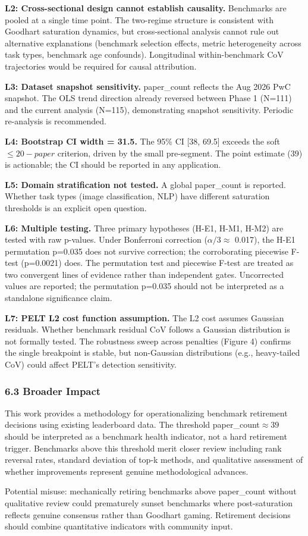 \textbf{L2: Cross-sectional design cannot establish causality.} Benchmarks are pooled at a single time point. The two-regime structure is consistent with Goodhart saturation dynamics, but cross-sectional analysis cannot rule out alternative explanations (benchmark selection effects, metric heterogeneity across task types, benchmark age confounds). Longitudinal within-benchmark CoV trajectories would be required for causal attribution.

\textbf{L3: Dataset snapshot sensitivity.} paper\_count reflects the Aug 2026 PwC snapshot. The OLS trend direction already reversed between Phase 1 (N=111) and the current analysis (N=115), demonstrating snapshot sensitivity. Periodic re-analysis is recommended.

\textbf{L4: Bootstrap CI width = 31.5.} The 95\% CI [38, 69.5] exceeds the soft $\leq 20-paper$ criterion, driven by the small pre-segment. The point estimate (39) is actionable; the CI should be reported in any application.

\textbf{L5: Domain stratification not tested.} A global paper\_count\* is reported. Whether task types (image classification, NLP) have different saturation thresholds is an explicit open question.

\textbf{L6: Multiple testing.} Three primary hypotheses (H-E1, H-M1, H-M2) are tested with raw p-values. Under Bonferroni correction ($\alpha /3 \approx$ 0.017), the H-E1 permutation p=0.035 does not survive correction; the corroborating piecewise F-test (p=0.0021) does. The permutation test and piecewise F-test are treated as two convergent lines of evidence rather than independent gates. Uncorrected values are reported; the permutation p=0.035 should not be interpreted as a standalone significance claim.

\textbf{L7: PELT L2 cost function assumption.} The L2 cost assumes Gaussian residuals. Whether benchmark residual CoV follows a Gaussian distribution is not formally tested. The robustness sweep across penalties (Figure 4) confirms the single breakpoint is stable, but non-Gaussian distributions (e.g., heavy-tailed CoV) could affect PELT's detection sensitivity.

\subsubsection{6.3 Broader Impact}

This work provides a methodology for operationalizing benchmark retirement decisions using existing leaderboard data. The threshold paper\_count\*$\approx 39$ should be interpreted as a benchmark health indicator, not a hard retirement trigger. Benchmarks above this threshold merit closer review including rank reversal rates, standard deviation of top-k methods, and qualitative assessment of whether improvements represent genuine methodological advances.

Potential misuse: mechanically retiring benchmarks above paper\_count without qualitative review could prematurely sunset benchmarks where post-saturation reflects genuine consensus rather than Goodhart gaming. Retirement decisions should combine quantitative indicators with community input.

